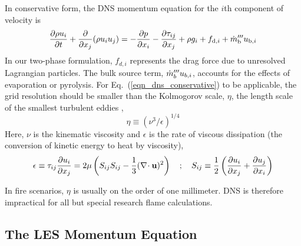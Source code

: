 In conservative form, the DNS momentum equation for the $i$th component of velocity is
\begin{equation}
\label{eqn_dns_conservative}
\frac{\partial \rho u_i}{\partial t} + \frac{\partial}{\partial x_j} (\rho u_i u_j) = -\frac{\partial p}{\partial x_i} - \frac{\partial \tau_{ij}}{\partial x_j} + \rho g_i + f_{{\rm d},i} + \dot{m}_{\rm b}^{\prime\prime\prime} u_{{\rm b},i}
\end{equation}
In our two-phase formulation, $f_{d,i}$ represents the drag force due to unresolved Lagrangian particles.  The bulk source term, $\dot{m}_b^{\prime\prime\prime} u_{b,i}$, accounts for the effects of evaporation or pyrolysis. For Eq.~(\ref{eqn_dns_conservative}) to be applicable, the grid resolution should be smaller than the Kolmogorov scale, $\eta$, the length scale of the smallest turbulent eddies \cite{Pope:2000},
\begin{equation}
\label{eqn_kolmogorov_scale}
\eta \equiv (\nu^3/\epsilon)^{1/4}
\end{equation}
Here, $\nu$ is the kinematic viscosity and $\epsilon$ is the rate of viscous dissipation (the conversion of kinetic energy to heat by viscosity),
\begin{equation}
\epsilon \equiv \tau_{ij} \frac{\partial u_i}{\partial x_j} = 2 \mu \left( S_{ij} S_{ij} - \frac{1}{3} (\nabla\!\cdot {\mathbf{u}})^2 \right) \quad ; \quad S_{ij} \equiv \frac{1}{2}\left(\frac{\partial u_i}{\partial x_j} + \frac{\partial u_j}{\partial x_i}\right)
\end{equation}

In fire scenarios, $\eta$ is usually on the order of one millimeter.  DNS is therefore impractical for all but special research flame calculations.

\subsection{The LES Momentum Equation}

